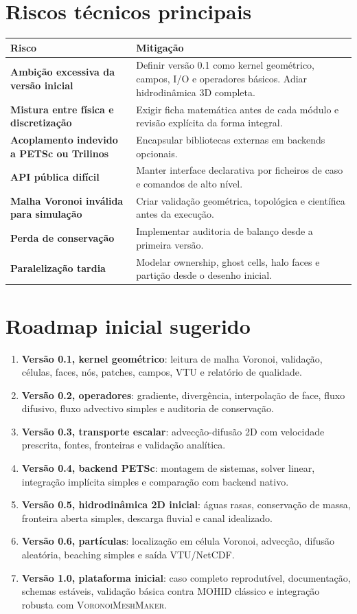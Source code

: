 \documentclass[11pt,a4paper]{article}
\newcommand{\vmm}{\textsc{VoronoiMeshMaker}}
\begin{document}
\section{Riscos técnicos principais}

\begin{tabularx}{\textwidth}{>{\sffamily\bfseries}p{}X}
\toprule
Risco & Mitigação \\
\midrule
Ambição excessiva da versão inicial & Definir versão 0.1 como kernel geométrico, campos, I/O e operadores básicos. Adiar hidrodinâmica 3D completa. \\
Mistura entre física e discretização & Exigir ficha matemática antes de cada módulo e revisão explícita da forma integral. \\
Acoplamento indevido a PETSc ou Trilinos & Encapsular bibliotecas externas em backends opcionais. \\
API pública difícil & Manter interface declarativa por ficheiros de caso e comandos de alto nível. \\
Malha Voronoi inválida para simulação & Criar validação geométrica, topológica e científica antes da execução. \\
Perda de conservação & Implementar auditoria de balanço desde a primeira versão. \\
Paralelização tardia & Modelar ownership, ghost cells, halo faces e partição desde o desenho inicial. \\
\bottomrule
\end{tabularx}

\section{Roadmap inicial sugerido}

\begin{enumerate}
\item \textbf{Versão 0.1, kernel geométrico}: leitura de malha Voronoi, validação, células, faces, nós, patches, campos, VTU e relatório de qualidade.
\item \textbf{Versão 0.2, operadores}: gradiente, divergência, interpolação de face, fluxo difusivo, fluxo advectivo simples e auditoria de conservação.
\item \textbf{Versão 0.3, transporte escalar}: advecção-difusão 2D com velocidade prescrita, fontes, fronteiras e validação analítica.
\item \textbf{Versão 0.4, backend PETSc}: montagem de sistemas, solver linear, integração implícita simples e comparação com backend nativo.
\item \textbf{Versão 0.5, hidrodinâmica 2D inicial}: águas rasas, conservação de massa, fronteira aberta simples, descarga fluvial e canal idealizado.
\item \textbf{Versão 0.6, partículas}: localização em célula Voronoi, advecção, difusão aleatória, beaching simples e saída VTU/NetCDF.
\item \textbf{Versão 1.0, plataforma inicial}: caso completo reprodutível, documentação, schemas estáveis, validação básica contra MOHID clássico e integração robusta com \vmm{}.
\end{enumerate}
\end{document}
